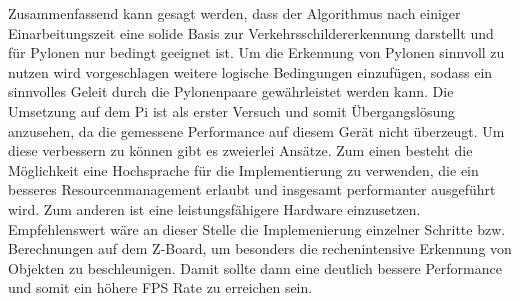 Zusammenfassend kann gesagt werden, dass der Algorithmus nach einiger Einarbeitungszeit eine solide Basis zur Verkehrsschildererkennung darstellt und für Pylonen nur bedingt geeignet ist. Um die Erkennung von Pylonen sinnvoll zu nutzen wird vorgeschlagen weitere logische Bedingungen einzufügen, sodass ein sinnvolles Geleit durch die Pylonenpaare gewährleistet werden kann. Die Umsetzung auf dem Pi ist als erster Versuch und somit Übergangslösung anzusehen, da die gemessene Performance auf diesem Gerät nicht überzeugt.
Um diese verbessern zu können gibt es zweierlei Ansätze. Zum einen besteht die Möglichkeit eine Hochsprache für die Implementierung zu verwenden, die ein besseres Resourcenmanagement erlaubt und insgesamt performanter ausgeführt wird. Zum anderen ist eine leistungsfähigere Hardware einzusetzen. Empfehlenswert wäre an dieser Stelle die Implemenierung einzelner Schritte bzw. Berechnungen auf dem Z-Board, um besonders die rechenintensive Erkennung von Objekten zu beschleunigen. Damit sollte dann eine deutlich bessere Performance und somit ein höhere FPS Rate zu erreichen sein.